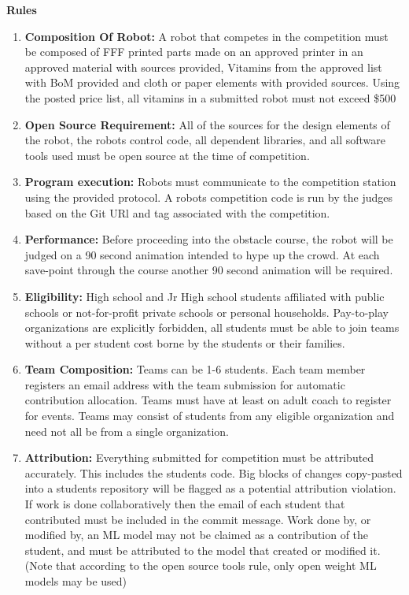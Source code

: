 \documentclass{article}
\begin{document}
  \pagebreak
{\huge \textbf{Rules}}

\begin{enumerate}
	
\item \textbf{Composition Of Robot:} A robot that competes in the competition must be composed of FFF printed parts made on an approved printer in an approved material with sources provided, Vitamins from the approved list with BoM provided and cloth or paper elements with provided sources. Using the posted price list, all vitamins in a submitted robot must not exceed \$500

\item \textbf{Open Source Requirement:} All of the sources for the design elements of the robot, the robots control code, all dependent libraries, and all software tools used must be open source at the time of competition. 

\item \textbf{Program execution:} Robots must communicate to the competition station using the provided protocol. A robots competition code is run by the judges based on the Git URl and tag associated with the competition. 


\item \textbf{Performance:} Before proceeding into the obstacle course, the robot will be judged on a 90 second animation intended to hype up the crowd. At each save-point through the course another 90 second animation will be required. 

\item \textbf{Eligibility:} High school and Jr High school students affiliated with public schools or not-for-profit private schools or personal households. Pay-to-play organizations are explicitly forbidden, all students must be able to join teams without a per student cost borne by the students or their families. 


\item \textbf{Team Composition:} Teams can be 1-6 students. Each team member registers an email address with the team submission for automatic contribution allocation. Teams must have at least on adult coach to register for events. Teams may consist of students from any eligible organization and need not all be from a single organization.  

 
\item \textbf{Attribution:} Everything submitted for competition must be attributed accurately. This includes the students code. Big blocks of changes copy-pasted into a students repository will be flagged as a potential attribution violation. If work is done collaboratively then the email of each student that contributed must be included in the commit message. Work done by, or modified by, an ML model may not be claimed as a contribution of the student, and must be attributed to the model that created or modified it. (Note that according to the open source tools rule, only open weight ML models may be used)




\end{enumerate}
\end{document}
